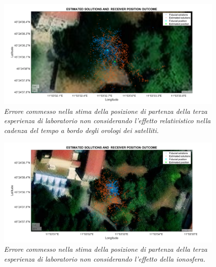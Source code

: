 \documentclass[a4paper,11pt,twoside]{book}
\begin{document}
	\begin{figure}[H]
		\centering
		\includegraphics[scale=0.31]{"Immagini workbook/Immagini esp3/err_rel"}
		\caption{\textit{Errore commesso nella stima della posizione di partenza della terza esperienza di laboratorio non considerando l'effetto relativistico nella cadenza del tempo a bordo degli orologi dei satelliti.}}
		\label{fig:errrel3}
	\end{figure}

	\vspace{-1cm}
	
	\begin{figure}[H]
		\centering
		\includegraphics[scale=0.31]{"Immagini workbook/Immagini esp3/err_iono"}
		\caption{\textit{Errore commesso nella stima della posizione di partenza della terza esperienza di laboratorio non considerando l'effetto della ionosfera.}}
		\label{fig:erriono3}
	\end{figure}

	\vspace{-1cm}
\end{document}
